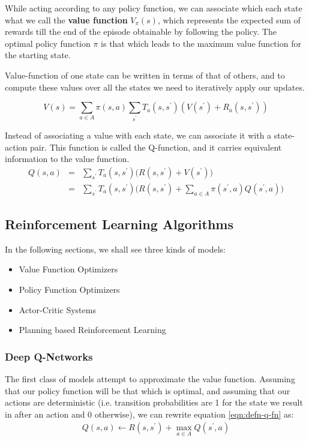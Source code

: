 While acting according to any policy function, we can associate which each state what we call the \textbf{value function} $V_{\pi}(s)$, which represents the expected sum of rewards till the end of the episode obtainable by following the policy. The optimal policy function $\pi$ is that which leads to the maximum value function for the starting state.

Value-function of one state can be written in terms of that of others, and to compute these values over all the states we need to iteratively apply our updates.

\begin{equation}
    V(s) = \sum_{a \in A} \pi(s, a) \sum_{s^\prime} T_a(s, s^\prime) (V(s^\prime) + R_a(s, s^\prime))
\end{equation}

Instead of associating a value with each state, we can associate it with a state-action pair. This function is called the Q-function, and it carries equivalent information to the value function.
\begin{eqnarray}\label{eqn:defn-q-v-fn}
    Q(s, a) &=& \sum_{s^\prime} T_a(s, s^\prime) \bigg(R(s, s^\prime) + V(s^\prime) \bigg)\\
            &=& \sum_{s^\prime} T_a(s, s^\prime) \bigg(R(s, s^\prime) + \sum_{a \in A} \pi(s^\prime, a) Q(s^\prime, a)\bigg)
\end{eqnarray}

\subsection{Reinforcement Learning Algorithms}

In the following sections, we shall see three kinds of models:
\begin{itemize}
    \item Value Function Optimizers
    \item Policy Function Optimizers
    \item Actor-Critic Systems
    \item Planning based Reinforcement Learning
\end{itemize}


\subsubsection{Deep Q-Networks}

The first class of models attempt to approximate the value function. Assuming that our policy function will be that which is optimal, and assuming that our actions are deterministic (i.e. transition probabilities are 1 for the state we result in after an action and 0 otherwise), we can rewrite equation \ref{eqn:defn-q-fn} as:
\begin{eqnarray}\label{eqn:defn-q-fn}
    Q(s, a) \leftarrow R(s, s^\prime) + \max_{a \in A} Q(s^\prime, a)
\end{eqnarray}

